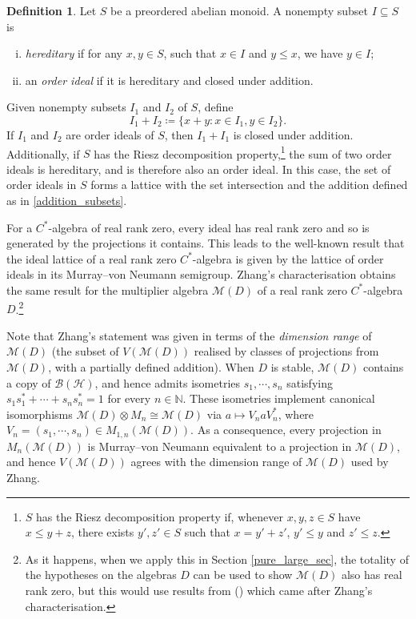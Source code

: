 \documentclass[reqno]{amsart}
\theoremstyle{definition}
\newtheorem{defn}[thm]{Definition}
\theoremstyle{remark}
\numberwithin{equation}{section}
\theoremstyle{definition}
\newcommand{\calH}{\mathcal{H}}
\newcommand{\calB}{\mathcal{B}}
\newcommand{\calM}{\mathcal{M}}
\begin{document}
\begin{defn} 
Let $S$ be a preordered abelian monoid. A nonempty subset $I \subseteq S$ is 
\begin{enumerate} [(i)]
\item \emph{hereditary} if for any $x, y\in S$, such that $x\in I$ and $y\leq x$, we have $y\in I$; 
\item an \emph{order ideal} if it is hereditary and closed under addition. 
\end{enumerate} 
Given nonempty subsets $I_{1}$ and $I_{2}$ of $S$, define 
\begin{equation} \label{addition_subsets} 
I_{1}+I_{2} \coloneqq \{x+y: x\in I_{1}, y\in I_{2}\}. 
\end{equation} 
If $I_{1}$ and $I_{2}$ are order ideals of $S$, then $I_{1}+I_{1}$ is closed under addition. Additionally, if $S$ has the Riesz decomposition property,\footnote{$S$ has the Riesz decomposition property if, whenever $x, y, z\in S$ have $x\leq y+z$, there exists $y', z'\in S$ such that $x = y'+ z'$, $y'\leq y$ and $z'\leq z$.} the sum of two order ideals is hereditary, and is therefore also an order ideal. In this case, the set of order ideals in $S$ forms a lattice with the set intersection and the addition defined as in \eqref{addition_subsets}. 
\end{defn} 

For a $C^*$-algebra of real rank zero, every ideal has real rank zero and so is generated by the projections it contains. This leads to the well-known result that the ideal lattice of a real rank zero $C^*$-algebra is given by the lattice of order ideals in its Murray--von Neumann semigroup. Zhang's characterisation obtains the same result for the multiplier algebra $\mathcal M(D)$ of a real rank zero $C^*$-algebra $D$.\footnote{As it happens, when we apply this in Section \ref{pure_large_sec}, the totality of the hypotheses on the algebras $D$ can be used to show $\mathcal M(D)$ also has real rank zero, but this would use results from (\cite{RR-LHX}) which came after Zhang's characterisation.} 

Note that Zhang's statement was given in terms of the \emph{dimension range} of $\mathcal M(D)$ (the subset of $V(\mathcal M(D))$ realised by classes of projections from $\mathcal M(D)$, with a partially defined addition). When $D$ is stable, $\calM(D)$ contains a copy of $\calB(\calH)$, and hence admits isometries $s_{1}, \cdots, s_{n}$ satisfying $s_{1}s_{1}^* + \cdots + s_{n}s_{n}^{*} = 1$ for every $n\in \mathbb{N}$. These isometries implement canonical isomorphisms $\mathcal M(D)\otimes M_n \cong \mathcal M(D)$ via $a\mapsto V_{n} a V_{n}^*$, where $V_{n} = (s_{1},\cdots, s_{n})\in M_{1, n}(\calM(D))$. As a consequence, every projection in $M_{n}(\calM(D))$ is Murray--von Neumann equivalent to a projection in $\calM(D)$, and hence $V(\mathcal M(D))$ agrees with the dimension range of $\mathcal M(D)$ used by Zhang. 
\end{document}
